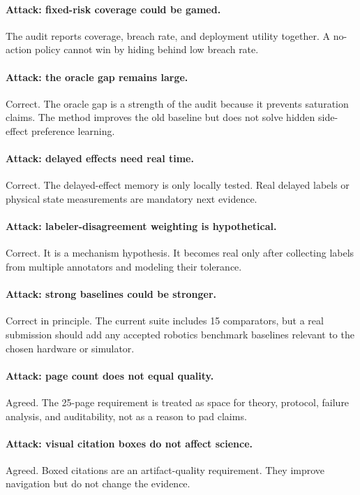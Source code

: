 \documentclass{article}
\begin{document}
\paragraph{Attack: fixed-risk coverage could be gamed.}
The audit reports coverage, breach rate, and deployment utility together. A no-action policy cannot win by hiding behind low breach rate.

\paragraph{Attack: the oracle gap remains large.}
Correct. The oracle gap is a strength of the audit because it prevents saturation claims. The method improves the old baseline but does not solve hidden side-effect preference learning.

\paragraph{Attack: delayed effects need real time.}
Correct. The delayed-effect memory is only locally tested. Real delayed labels or physical state measurements are mandatory next evidence.

\paragraph{Attack: labeler-disagreement weighting is hypothetical.}
Correct. It is a mechanism hypothesis. It becomes real only after collecting labels from multiple annotators and modeling their tolerance.

\paragraph{Attack: strong baselines could be stronger.}
Correct in principle. The current suite includes 15 comparators, but a real submission should add any accepted robotics benchmark baselines relevant to the chosen hardware or simulator.

\paragraph{Attack: page count does not equal quality.}
Agreed. The 25-page requirement is treated as space for theory, protocol, failure analysis, and auditability, not as a reason to pad claims.

\paragraph{Attack: visual citation boxes do not affect science.}
Agreed. Boxed citations are an artifact-quality requirement. They improve navigation but do not change the evidence.
\end{document}
